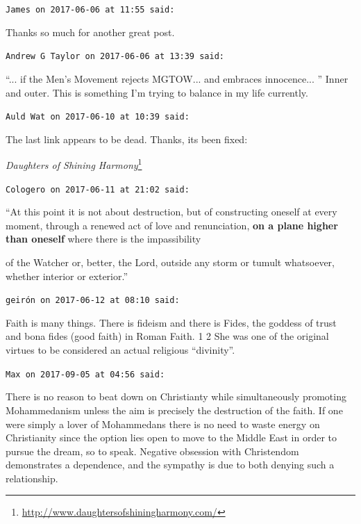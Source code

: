 \begin{footnotesize}
\begin{sffamily}
\texttt{James on 2017-06-06 at 11:55 said:}

Thanks so much for another great post.

\hfill

\texttt{Andrew G Taylor on 2017-06-06 at 13:39 said:}

``... if the Men's Movement rejects MGTOW... and embraces innocence... '' Inner and outer. This is something I'm trying to balance in my life currently.

\hfill

\texttt{Auld Wat on 2017-06-10 at 10:39 said:}

The last link appears to be dead. Thanks, its been fixed:

\textit{Daughters of Shining Harmony}\footnote{\url{http://www.daughtersofshiningharmony.com/}} 

\hfill

\texttt{Cologero on 2017-06-11 at 21:02 said:}

``At this point it is not about destruction, but of constructing oneself at every moment, through a renewed act of love and renunciation,
\textbf{on a plane higher than oneself} where there is the impassibility

of the Watcher or, better, the Lord, outside any storm or tumult whatsoever, whether interior or exterior.''

\hfill

\texttt{geirón on 2017-06-12 at 08:10 said:}

Faith is many things. There is fideism and there is Fides, the goddess of trust and bona fides (good faith) in Roman Faith. 1  2 She was one of the original virtues to be considered an actual religious ``divinity''.

\hfill

\texttt{Max on 2017-09-05 at 04:56 said:}

There is no reason to beat down on Christianty while simultaneously promoting Mohammedanism unless the aim is precisely the destruction of the faith. If one were simply a lover of Mohammedans there is no need to waste energy on Christianity since the option lies open to move to the Middle East in order to pursue the dream, so to speak. Negative obsession with Christendom demonstrates a dependence, and the sympathy is due to both denying such a relationship.

\end{sffamily}
\end{footnotesize}

